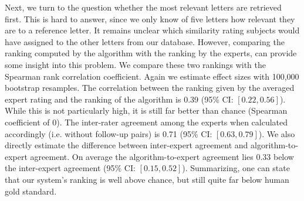 Next, we turn to the question whether the most relevant letters are retrieved first. This is hard to answer, since we only know of five letters how relevant they are to a reference letter. It remains unclear which similarity rating subjects would have assigned to the other letters from our database. However, comparing the ranking computed by the algorithm with the ranking by the experts, can provide some insight into this problem. We compare these two rankings with the Spearman rank correlation coefficient. Again we estimate effect sizes with 100,000 bootstrap resamples. The correlation between the ranking given by the averaged expert rating and the ranking of the algorithm is 0.39 (95\% CI: $[0.22, 0.56]$). While this is not particularly high, it is still far better than chance (Spearman coefficient of 0). The inter-rater agreement among the experts when calculated accordingly (i.e. without follow-up pairs) is 0.71 (95\% CI: $[0.63, 0.79]$). We also directly estimate the difference between inter-expert agreement and algorithm-to-expert agreement. On average the algorithm-to-expert agreement lies 0.33 below the inter-expert agreement (95\% CI: $[0.15, 0.52]$). Summarizing, one can state that our system's ranking is well above chance, but still quite far below human gold standard.





